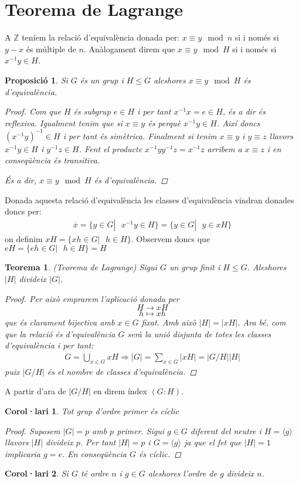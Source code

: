 \documentclass[a4paper,11pt]{report}
\newcommand{\inv}[1]{#1^{-1}}
\renewcommand{\bar}{\overline}
\theoremstyle{theorem}
\newtheorem{proposicio}{\normalfont \sffamily\bfseries Proposició}[section]
\newtheorem{teorema}{\normalfont \sffamily\bfseries Teorema}[section]
\newtheorem{col}{\normalfont \sffamily\bfseries Corol·lari}[section]
\theoremstyle{definition}
\begin{document}
\section{Teorema de Lagrange}
A $\mathbb{Z}$ teníem la relació d'equivalència donada per:
$x\equiv y \mod n$ si i només si $y-x$ és múltiple de $n$. Anàlogament direm que $x\equiv y \mod H$ si i només si $\inv{x}y\in H$.
\begin{proposicio}
	Si $G$ és un grup i $H\leq G$ aleshores $x\equiv y \mod H$ és d'equivalència.
	\begin{proof}
	Com que $H$ és subgrup $e\in H$ i per tant $\inv{x}x=e\in H$, és a dir és reflexiva.
	Igualment tenim que si $x\equiv y$ és perquè $\inv{x}y \in H$. Així doncs $\inv{(\inv{x}y)}\in H$ i per tant és simètrica.
	Finalment si tenim $x\equiv y$ i $y\equiv z$ llavors $\inv{x}y\in H$ i $\inv{y}z\in H$. Fent el producte $\inv{x}y\inv{y}z=\inv{x}z$ arribem a $x\equiv z$ i en conseqüència és transitiva.
	
	És a dir, $x\equiv y \mod H$ és d'equivalència.	
		\end{proof}
\end{proposicio}
Donada aquesta relació d'equivalència les classes d'equivalència vindran donades doncs per:
\begin{align*}
	\bar{x}=\{y\in G|\text{ }\inv{x}y\in H\}=\{y\in G|\text{ }y\in xH\}
\end{align*}
on definim $xH=\{xh\in G|\text{ }h\in H\}$. Observem doncs que $eH=\{eh\in G|\text{ }h\in H\}=H$
\begin{teorema}(Teorema de Lagrange) Sigui $G$ un grup finit i $H\leq G$. Aleshores $|H|$ divideix $|G|$.
	\begin{proof}
		Per això emprarem l'aplicació donada per
		$$H \longrightarrow xH $$ $$ h\longmapsto xh$$
		que és clarament bijectiva amb $x\in G$ fixat. Amb això $|H|=|xH|$. Ara bé, com que la relació és d'equivalència $G$ serà la unió disjunta de totes les classes d'equivalència i per tant:
		\begin{align*}
			G=\bigcup_{x\in G}xH\Longrightarrow |G|=\sum_{x\in G} |xH|=|G/H||H|
		\end{align*}
		puix $|G/H|$ és el nombre de classes d'equivalència.
	\end{proof}
	
\end{teorema}

A partir d'ara de $|G/H|$ en direm índex $(G:H)$.
\begin{col}
	Tot grup d'ordre primer és cíclic
	\begin{proof}
		Suposem $|G|=p$ amb $p$ primer. Sigui $g\in G$ diferent del neutre i $H=\langle g\rangle$ llavors $|H|$ divideix $p$. Per tant $|H|=p$ i $G=\langle g\rangle$ ja que el fet que $|H|=1$ implicaria $g=e$. En conseqüència $G$ és cíclic.
	\end{proof}
\end{col}
\begin{col}
	Si $G$ té ordre $n$ i $g\in G$ aleshores l'ordre de $g$ divideix $n$.
\end{col}
\end{document}
